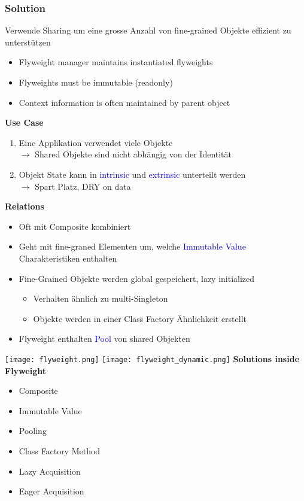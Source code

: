 \subsubsection{Solution}

Verwende Sharing um eine grosse Anzahl von fine-grained Objekte effizient zu unterstützen

\begin{itemize}
    \item Flyweight manager maintains instantiated flyweights
    \item Flyweights must be immutable (readonly)
    \item Context information is often maintained by parent object
\end{itemize}
\vspace{10pt}
\textbf{Use Case}

\begin{enumerate}
    \item Eine Applikation verwendet viele Objekte \\ $\rightarrow$ Shared Objekte sind nicht abhängig von der Identität
    \item Objekt State kann in \textcolor{blue}{intrinsic} und \textcolor{blue}{extrinsic} unterteilt werden \\ $\rightarrow$ Spart Platz, DRY on data
\end{enumerate}

\textbf{Relations}

\begin{itemize}
    \item Oft mit Composite kombiniert
    \item Geht mit fine-graned Elementen um, welche \textcolor{blue}{Immutable Value} Charakteristiken enthalten
    \item Fine-Grained Objekte werden global gespeichert, lazy initialized
    \begin{itemize}
        \item Verhalten ähnlich zu multi-Singleton
        \item Objekte werden in einer Class Factory Ähnlichkeit erstellt
    \end{itemize}
    \item Flyweight enthalten \textcolor{blue}{Pool} von shared Objekten
\end{itemize}

\texttt{[image: flyweight.png]}
\texttt{[image: flyweight\_dynamic.png]}
\textbf{Solutions inside Flyweight}
\begin{itemize}
    \item Composite
    \item Immutable Value
    \item Pooling
    \item Class Factory Method
    \item Lazy Acquisition
    \item Eager Acquisition
\end{itemize}

